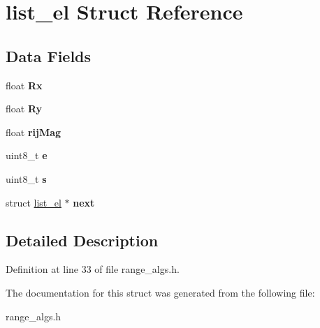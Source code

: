 \hypertarget{structlist__el}{\section{list\+\_\+el Struct Reference}
\label{structlist__el}
}
\subsection*{Data Fields}
\begin{DoxyCompactItemize}
\item 
\hypertarget{structlist__el_af4664da9cedbdf348c12870102abff8b}{float {\bfseries Rx}}\label{structlist__el_af4664da9cedbdf348c12870102abff8b}

\item 
\hypertarget{structlist__el_a4a612597c430bf08ace8e63d2bebde49}{float {\bfseries Ry}}\label{structlist__el_a4a612597c430bf08ace8e63d2bebde49}

\item 
\hypertarget{structlist__el_a5b866042d4f51f2569525dcbbcb6388c}{float {\bfseries rij\+Mag}}\label{structlist__el_a5b866042d4f51f2569525dcbbcb6388c}

\item 
\hypertarget{structlist__el_a0b8c907bd304c76f15115f2c217ca983}{uint8\+\_\+t {\bfseries e}}\label{structlist__el_a0b8c907bd304c76f15115f2c217ca983}

\item 
\hypertarget{structlist__el_a7ae5f2f2c2ad5b2ffd0fbdc4412b0377}{uint8\+\_\+t {\bfseries s}}\label{structlist__el_a7ae5f2f2c2ad5b2ffd0fbdc4412b0377}

\item 
\hypertarget{structlist__el_af3c3716b92c1983bb6f5454aee644319}{struct \hyperlink{structlist__el}{list\+\_\+el} $\ast$ {\bfseries next}}\label{structlist__el_af3c3716b92c1983bb6f5454aee644319}

\end{DoxyCompactItemize}


\subsection{Detailed Description}


Definition at line 33 of file range\+\_\+algs.\+h.



The documentation for this struct was generated from the following file\+:\begin{DoxyCompactItemize}
\item 
range\+\_\+algs.\+h\end{DoxyCompactItemize}
